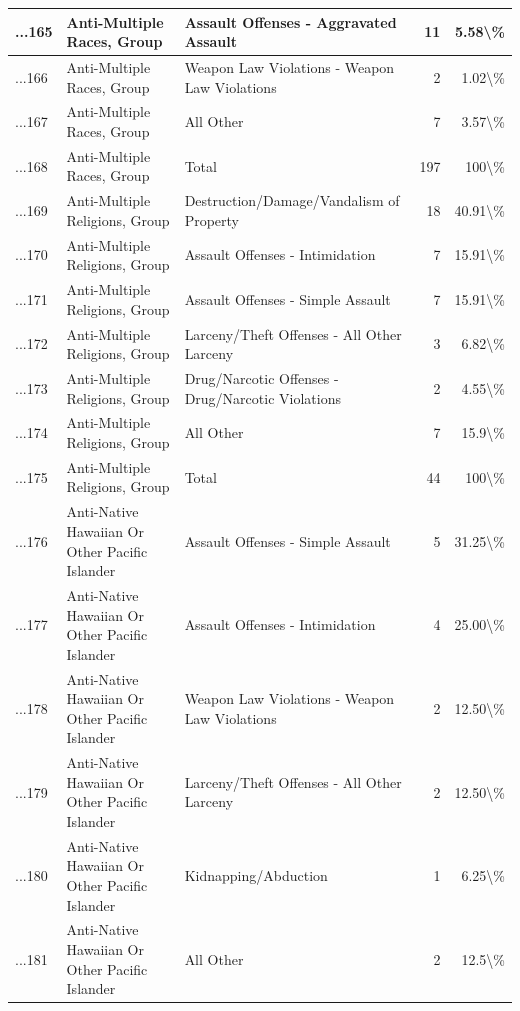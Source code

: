 \documentclass[
]{krantz}
\begin{document}
\begin{longtable}[t]{l|l|l|r|r}
\hline
...165 & Anti-Multiple Races, Group & Assault Offenses - Aggravated Assault & 11 & 5.58\textbackslash{}\%\\
\hline
...166 & Anti-Multiple Races, Group & Weapon Law Violations - Weapon Law Violations & 2 & 1.02\textbackslash{}\%\\
\hline
...167 & Anti-Multiple Races, Group & All Other & 7 & 3.57\textbackslash{}\%\\
\hline
...168 & Anti-Multiple Races, Group & Total & 197 & 100\textbackslash{}\%\\
\hline
...169 & Anti-Multiple Religions, Group & Destruction/Damage/Vandalism of Property & 18 & 40.91\textbackslash{}\%\\
\hline
...170 & Anti-Multiple Religions, Group & Assault Offenses - Intimidation & 7 & 15.91\textbackslash{}\%\\
\hline
...171 & Anti-Multiple Religions, Group & Assault Offenses - Simple Assault & 7 & 15.91\textbackslash{}\%\\
\hline
...172 & Anti-Multiple Religions, Group & Larceny/Theft Offenses - All Other Larceny & 3 & 6.82\textbackslash{}\%\\
\hline
...173 & Anti-Multiple Religions, Group & Drug/Narcotic Offenses - Drug/Narcotic Violations & 2 & 4.55\textbackslash{}\%\\
\hline
...174 & Anti-Multiple Religions, Group & All Other & 7 & 15.9\textbackslash{}\%\\
\hline
...175 & Anti-Multiple Religions, Group & Total & 44 & 100\textbackslash{}\%\\
\hline
...176 & Anti-Native Hawaiian Or Other Pacific Islander & Assault Offenses - Simple Assault & 5 & 31.25\textbackslash{}\%\\
\hline
...177 & Anti-Native Hawaiian Or Other Pacific Islander & Assault Offenses - Intimidation & 4 & 25.00\textbackslash{}\%\\
\hline
...178 & Anti-Native Hawaiian Or Other Pacific Islander & Weapon Law Violations - Weapon Law Violations & 2 & 12.50\textbackslash{}\%\\
\hline
...179 & Anti-Native Hawaiian Or Other Pacific Islander & Larceny/Theft Offenses - All Other Larceny & 2 & 12.50\textbackslash{}\%\\
\hline
...180 & Anti-Native Hawaiian Or Other Pacific Islander & Kidnapping/Abduction & 1 & 6.25\textbackslash{}\%\\
\hline
...181 & Anti-Native Hawaiian Or Other Pacific Islander & All Other & 2 & 12.5\textbackslash{}\%\\

\end{longtable}
\end{document}
